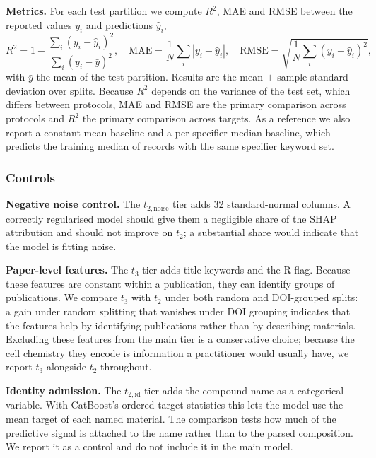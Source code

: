 \documentclass[journal=jcisd8,manuscript=article,layout=traditional]{achemso}
\begin{document}
\textbf{Metrics.} For each test partition we compute $R^2$, MAE and RMSE between the reported values $y_i$ and predictions $\hat y_i$,
\begin{equation}
    R^2 = 1-\frac{\sum_{i}(y_i-\hat{y}_i)^2}{\sum_{i}(y_i-\bar{y})^2},\quad
    \mathrm{MAE} = \frac{1}{N}\sum_{i}|y_i-\hat{y}_i|,\quad
    \mathrm{RMSE} = \sqrt{\frac{1}{N}\sum_{i}(y_i-\hat{y}_i)^2},
\end{equation}
with $\bar y$ the mean of the test partition. Results are the mean $\pm$ sample standard deviation over splits. Because $R^2$ depends on the variance of the test set, which differs between protocols, MAE and RMSE are the primary comparison across protocols and $R^2$ the primary comparison across targets. As a reference we also report a constant-mean baseline and a per-specifier median baseline, which predicts the training median of records with the same specifier keyword set.

\subsubsection{Controls}
\label{sec:controls}

\textbf{Negative noise control.} The $t_{2,\mathrm{noise}}$ tier adds 32 standard-normal columns. A correctly regularised model should give them a negligible share of the SHAP attribution and should not improve on $t_2$; a substantial share would indicate that the model is fitting noise.

\textbf{Paper-level features.} The $t_3$ tier adds title keywords and the R flag. Because these features are constant within a publication, they can identify groups of publications. We compare $t_3$ with $t_2$ under both random and DOI-grouped splits: a gain under random splitting that vanishes under DOI grouping indicates that the features help by identifying publications rather than by describing materials. Excluding these features from the main tier is a conservative choice; because the cell chemistry they encode is information a practitioner would usually have, we report $t_3$ alongside $t_2$ throughout.

\textbf{Identity admission.} The $t_{2,\mathrm{id}}$ tier adds the compound name as a categorical variable. With CatBoost's ordered target statistics this lets the model use the mean target of each named material. The comparison tests how much of the predictive signal is attached to the name rather than to the parsed composition. We report it as a control and do not include it in the main model.
\end{document}
